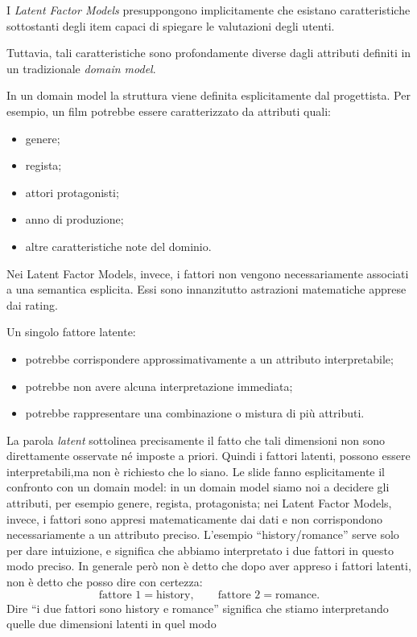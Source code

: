 I \emph{Latent Factor Models} presuppongono implicitamente che esistano caratteristiche sottostanti degli item capaci di spiegare le valutazioni degli utenti.

Tuttavia, tali caratteristiche sono profondamente diverse dagli attributi definiti in un tradizionale \emph{domain model}.

In un domain model la struttura viene definita esplicitamente dal progettista. Per esempio, un film potrebbe essere caratterizzato da attributi quali:
\begin{itemize}
    \item genere;
    \item regista;
    \item attori protagonisti;
    \item anno di produzione;
    \item altre caratteristiche note del dominio.
\end{itemize}

Nei Latent Factor Models, invece, i fattori non vengono necessariamente associati a una semantica esplicita. Essi sono innanzitutto astrazioni matematiche apprese dai rating.

Un singolo fattore latente:
\begin{itemize}
    \item potrebbe corrispondere approssimativamente a un attributo interpretabile;
    \item potrebbe non avere alcuna interpretazione immediata;
    \item potrebbe rappresentare una combinazione o mistura di più attributi.
\end{itemize}

La parola \emph{latent} sottolinea precisamente il fatto che tali dimensioni non sono direttamente osservate né imposte a priori.
Quindi i fattori latenti, possono essere interpretabili,ma non è richiesto che lo siano.
Le slide fanno esplicitamente il confronto con un domain model: in un domain model siamo noi a decidere gli attributi, per esempio genere, regista, protagonista; nei Latent Factor Models, invece, i fattori sono appresi matematicamente dai dati e non corrispondono necessariamente a un attributo preciso.
L'esempio “history/romance” serve solo per dare intuizione, e significa che abbiamo interpretato i due fattori in questo modo preciso.
In generale però non è detto che dopo aver appreso i fattori latenti, non è detto che posso dire con certezza:
\[
\text{fattore 1}=\text{history},
\qquad
\text{fattore 2}=\text{romance}.
\]
Dire “i due fattori sono history e romance” significa che stiamo interpretando quelle due dimensioni latenti in quel modo
